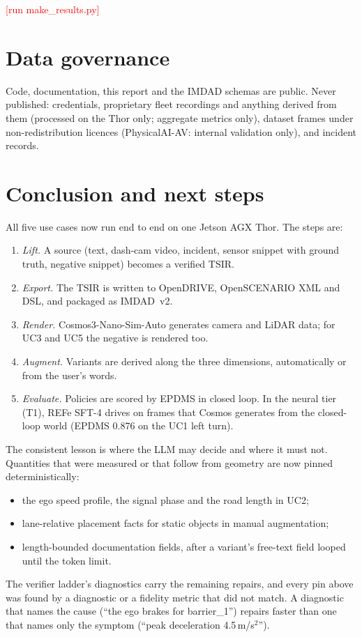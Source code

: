 \documentclass[10pt,a4paper]{article}
\newcommand{\todo}[1]{\textcolor{red}{[#1]}}
\newcommand{\ResultsUCfourfive}{\todo{run make\_results.py}}%
\begin{document}
\ResultsUCfourfive

\section{Data governance}
Code, documentation, this report and the IMDAD schemas are public. Never published: credentials, proprietary
fleet recordings and anything derived from them (processed on the Thor only; aggregate metrics only), dataset
frames under non-redistribution licences (PhysicalAI-AV: internal validation only), and incident records.

\section{Conclusion and next steps}
All five use cases now run end to end on one Jetson AGX Thor. The steps are:
\begin{enumerate}[leftmargin=1.4em,itemsep=0pt]
\item \emph{Lift.} A source (text, dash-cam video, incident, sensor snippet with ground truth, negative snippet)
  becomes a verified TSIR.
\item \emph{Export.} The TSIR is written to OpenDRIVE, OpenSCENARIO XML and DSL, and packaged as IMDAD~v2.
\item \emph{Render.} Cosmos3-Nano-Sim-Auto generates camera and LiDAR data; for UC3 and UC5 the negative is
  rendered too.
\item \emph{Augment.} Variants are derived along the three dimensions, automatically or from the user's words.
\item \emph{Evaluate.} Policies are scored by EPDMS in closed loop. In the neural tier (T1), REFe SFT-4 drives on
  frames that Cosmos generates from the closed-loop world (EPDMS 0.876 on the UC1 left turn).
\end{enumerate}

The consistent lesson is where the LLM may decide and where it must not. Quantities that were measured or that
follow from geometry are now pinned deterministically:
\begin{itemize}[leftmargin=1.4em,itemsep=0pt]
\item the ego speed profile, the signal phase and the road length in UC2;
\item lane-relative placement facts for static objects in manual augmentation;
\item length-bounded documentation fields, after a variant's free-text field looped until the token limit.
\end{itemize}
The verifier ladder's diagnostics carry the remaining repairs, and every pin above was found by a diagnostic or a
fidelity metric that did not match. A diagnostic that names the cause (``the ego brakes for barrier\_1'') repairs
faster than one that names only the symptom (``peak deceleration 4.5\,m/s$^2$'').
\end{document}
